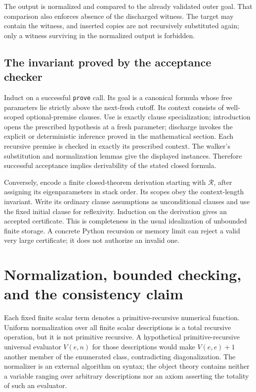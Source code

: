 The output is normalized and compared to the already validated outer goal.
That comparison also enforces absence of the discharged witness. The target
may contain the witness, and inserted copies are not recursively substituted
again; only a witness surviving in the normalized output is forbidden.

\subsection{The invariant proved by the acceptance checker}

Induct on a successful \texttt{prove} call. Its goal is a canonical formula
whose free parameters lie strictly above the next-fresh cutoff. Its context
consists of well-scoped optional-premise clauses. Use is exactly clause
specialization; introduction opens the prescribed hypothesis at a fresh
parameter; discharge invokes the explicit or deterministic inference proved
in the mathematical section. Each recursive premise is checked in exactly
its prescribed context. The walker's substitution and normalization lemmas
give the displayed instances. Therefore successful acceptance implies
derivability of the stated closed formula.

Conversely, encode a finite closed-theorem derivation starting with
$\mathcal R$, after assigning its eigenparameters
in stack order. Its scopes obey the context-length invariant. Write its
ordinary clause assumptions as unconditional clauses and use the fixed
initial clause for reflexivity. Induction on the derivation gives an accepted
certificate. This is completeness in the usual idealization of unbounded
finite storage. A concrete Python recursion or memory limit can reject a
valid very large certificate; it does not authorize an invalid one.

\section{Normalization, bounded checking, and the consistency claim}
\label{sec:bounded}

Each fixed finite scalar term denotes a primitive-recursive numerical
function. Uniform normalization over all finite scalar descriptions is a
total recursive operation, but it is not primitive recursive. A hypothetical
primitive-recursive universal evaluator $V(e,n)$ for those descriptions
would make $V(e,e)+1$ another member of the enumerated class, contradicting
diagonalization. The normalizer is an external algorithm on syntax; the
object theory contains neither a variable ranging over arbitrary descriptions
nor an axiom asserting the totality of such an evaluator.

